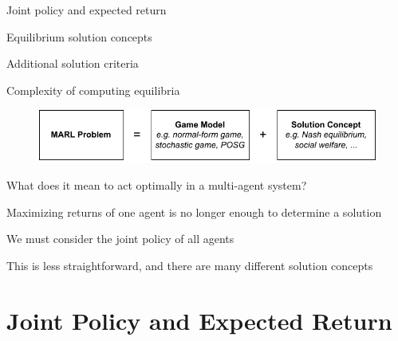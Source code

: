 

\leoslide

\subtitle{Solution Concepts for Games}


\maketitle

\introslide

\begin{frame}{\outline}

\blist
    \item Joint policy and expected return
    \item Equilibrium solution concepts
    \item Additional solution criteria 
    \item Complexity of computing equilibria
\elist
    
\end{frame}

\begin{frame}{}

    \begin{figure}
        \centering
        \includegraphics{images/chapter_4/marl-learning-problem.pdf}
    \end{figure}
    
    What does it mean to act optimally in a multi-agent system?

    \blist
        \item Maximizing returns of one agent is no longer enough to determine a solution
        \item We must consider the joint policy of all agents
        \item This is less straightforward, and there are many different solution concepts
    \elist
    
\end{frame}

\section{Joint Policy and Expected Return}

